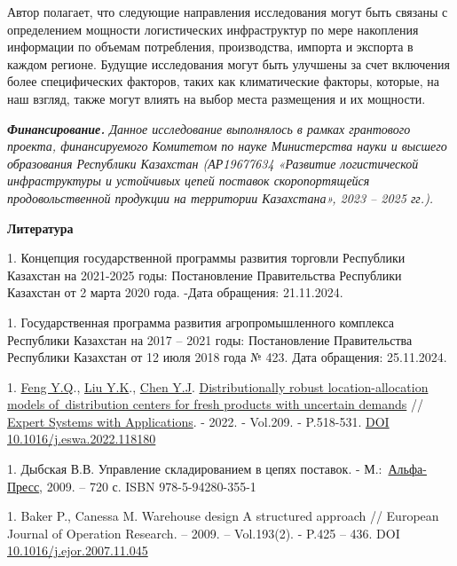 Автор полагает, что следующие направления исследования могут быть
связаны с определением мощности логистических инфраструктур по мере
накопления информации по объемам потребления, производства, импорта и
экспорта в каждом регионе. Будущие исследования могут быть улучшены за
счет включения более специфических факторов, таких как климатические
факторы, которые, на наш взгляд, также могут влиять на выбор места
размещения и их мощности.

\emph{{\bfseries Финансирование.} Данное исследование выполнялось в рамках
грантового проекта, финансируемого Комитетом по науке Министерства науки
и высшего образования Республики Казахстан (АР19677634 «Развитие
логистической инфраструктуры и устойчивых цепей поставок скоропортящейся
продовольственной продукции на территории Казахстана», 2023 -- 2025
гг.).}

{\bfseries Литература}


1. Концепция государственной программы развития торговли Республики
Казахстан на 2021-2025 годы: Постановление Правительства Республики
Казахстан от 2 марта 2020 года.
\href{https://www.gov.kz/memleket/entities/mti/documents/details/61426?lang=ru}{}
-Дата обращения: 21.11.2024.

1. Государственная программа развития агропромышленного комплекса
Республики Казахстан на 2017 -- 2021 годы: Постановление Правительства
Республики Казахстан от 12 июля 2018 года № 423.
\href{https://adilet.zan.kz/rus/docs/P1800000423-}{}
Дата обращения: 25.11.2024.

1. \href{https://www.webofscience.com/wos/author/record/34864370}{Feng
Y.Q}.,
\href{https://www.webofscience.com/wos/author/record/33997583}{Liu
Y.K}.,
\href{https://www.webofscience.com/wos/author/record/34807908}{Chen
Y.J}.
\href{https://www.webofscience.com/wos/woscc/full-record/WOS:000859686100002}{Distributionally
robust location-allocation models of~distribution centers for fresh
products with uncertain demands} //
\href{https://www.sciencedirect.com/journal/expert-systems-with-applications}{Expert
Systems with Applications}. - 2022. - Vol.209. - P.518-531.
\href{https://doi.org/10.1016/j.eswa.2022.118180}{DOI
10.1016/j.eswa.2022.118180}

1. Дыбская В.В. Управление складированием в цепях поставок. -
М.:~\href{https://publications.hse.ru/books/?pb=57130529}{Альфа-Пресс},
2009. -- 720 с. ISBN 978-5-94280-355-1

1. Baker P., Canessa M. Warehouse design A structured approach //
European Journal of Operation Research. -- 2009. -- Vol.193(2). -
P.425 -- 436. DOI
\href{http://dx.doi.org/10.1016/j.ejor.2007.11.045}{10.1016/j.ejor.2007.11.045}

